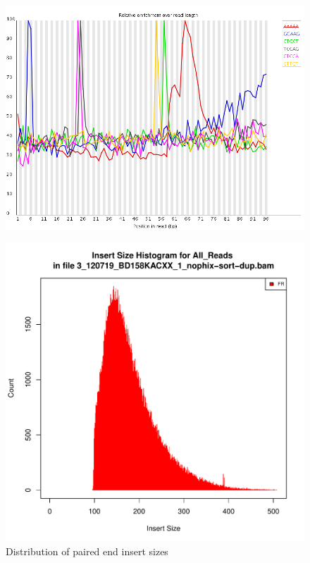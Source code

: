 \documentclass{article}
\begin{document}
    \begin{figure}[htbp]
      \centering
      \includegraphics[width=0.85\linewidth] {fastqc/3_120719_BD158KACXX_1_nophix-sort-dup_fastqc/Images/kmer_profiles.png}
      \caption{}
    \end{figure}
    \begin{figure}[htbp]
      \centering
      \includegraphics[width=0.75\linewidth] {3_120719_BD158KACXX_1_nophix-sort-dup-insert.pdf}
      \caption{Distribution of paired end insert sizes}
    \end{figure}


\FloatBarrier
\FloatBarrier
\end{document}
